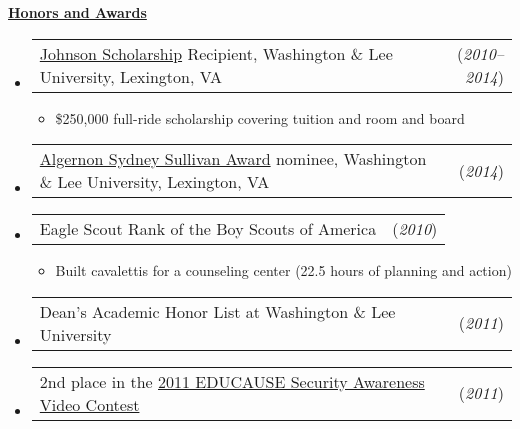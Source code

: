 \documentclass[11pt, letterpaper]{letter}
\makeatletter
\newlength{\indwidth}				\setlength{\indwidth}{\textwidth-.4in}
\newlength{\listSpacing}			\setlength{\listSpacing}{.0375in}
\newlength{\sectionSpacing}			\setlength{\sectionSpacing}{-1pt}
\newlength{\headerAntispace}		\setlength{\headerAntispace}{-6pt}
\newlength{\subListAntispace}		\setlength{\subListAntispace}{-.25in}
\newlength{\subListEndAntispace}	\setlength{\subListEndAntispace}{-.075in}
\newcommand{\lst}[1]{\vspace{\subListAntispace}\begin{itemize} \item #1 \end{itemize}\vspace{\subListEndAntispace}}
\newcommand{\dated}[2]{
	\begin{tabular*}{\indwidth}{l@{\extracolsep{\fill}}r}#1 & (\textit{#2})\end{tabular*}}
\newcommand \myul[3]{%
	\begingroup%
	\renewcommand \ULdepth {#1}%
	\renewcommand \ULthickness {#2}%
	\uline{#3}%
	\endgroup%
}
\newcommand \sectionheader[1]{
	\myul{2.7pt}{0.5pt}{\large \textbf{#1}}
}
\makeatother
\begin{document}
\vspace{\sectionSpacing}


\sectionheader{Honors and Awards}
\vspace{\headerAntispace}
\begin{itemize}
	\setlength{\itemsep}{\listSpacing}
	\item \dated{\href{http://go.wlu.edu/johnson}{Johnson Scholarship} Recipient, Washington \& Lee University, Lexington, VA}{2010--2014}
		\lst{\$250,000 full-ride scholarship covering tuition and room and board}
	\item \dated{\href{http://www2.wlu.edu/x35950.xml}{Algernon Sydney Sullivan Award} nominee, Washington \& Lee University, Lexington, VA}{2014}
	\item \dated{Eagle Scout Rank of the Boy Scouts of America}{2010}
		\lst{Built cavalettis for a counseling center (22.5 hours of planning and action)}
	\item \dated{Dean's Academic Honor List at Washington \& Lee University}{2011}
	\iftoggle{leesummer}{\item \dated{Robert E. Lee Research Scholars Program Participant}{2011}
		\iftoggle{leesummerdesc}{\lst{Deployed a \href{http://www.htcondorproject.org/}{Condor} supercomputing/HTC cluster on my university's campus}}{}
	}{}
	\item \dated{2nd place in the \href{https://web.chapman.edu/informationsecurityupload/contestresults.aspx}{2011 EDUCAUSE Security Awareness Video Contest}}{2011}
	\iftoggle{questiefinalist}{\item \dated{\href{http://questbridge.org/}{QuestBridge} National College Match Scholarship Finalist}{2009}}{\vspace{-7pt}}
	\iftoggle{ossmscholar}{\item \dated{OSSM Computer Science Scholar Award}{2009}}{\vspace{-7pt}}
\end{itemize}

\vspace{\sectionSpacing}

\end{document}
